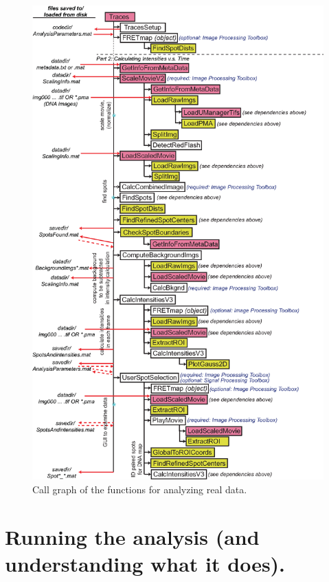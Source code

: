 \documentclass[11pt]{article}
\begin{document}
\begin{figure}[!p]
\begin{center}
\includegraphics[width=5.3in]{TracesFlowchart2.eps}
\caption{Call graph of the functions for analyzing real data.}
\label{fig:CodeConnectivity2}
\end{center}
\end{figure}

\clearpage

\section{Running the analysis (and understanding what it does).}
\end{document}
